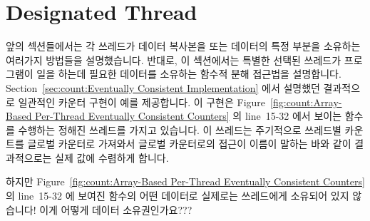 \section{Designated Thread}
\label{sec:owned:Designated Thread}

앞의 섹션들에서는 각 쓰레드가 데이터 복사본을 또는 데이터의 특정 부분을
소유하는 여러가지 방법들을 설명했습니다.
반대로, 이 섹션에서는 특별한 선택된 쓰레드가 프로그램이 일을 하는데 필요한
데이터를 소유하는 함수적 분해 접근법을 설명합니다.
Section~\ref{sec:count:Eventually Consistent Implementation} 에서 설명했던
결과적으로 일관적인 카운터 구현이 예를 제공합니다.
이 구현은
Figure~\ref{fig:count:Array-Based Per-Thread Eventually Consistent Counters} 의
line~15-32 에서 보이는  함수를 수행하는 정해진 쓰레드를 가지고
있습니다.
이  쓰레드는 주기적으로 쓰레드별 카운트를 글로벌 카운터로
가져와서 글로벌 카운터로의 접근이 이름이 말하는 바와 같이 결과적으로는 실제
값에 수렴하게 합니다.
\iffalse

The earlier sections describe ways of allowing each thread to keep its
own copy or its own portion of the data.
In contrast, this section describes a functional-decomposition approach,
where a special designated thread owns the rights to the data
that is required to do its job.
The eventually consistent counter implementation described in
Section~\ref{sec:count:Eventually Consistent Implementation} provides an example.
This implementation has a designated thread that runs the
\co{eventual()} function shown on lines~15-32 of
Figure~\ref{fig:count:Array-Based Per-Thread Eventually Consistent Counters}.
This \co{eventual()} thread periodically pulls the per-thread counts
into the global counter, so that accesses to the global counter will,
as the name says, eventually converge on the actual value.
\fi

\QuickQuiz{}
	하지만
	Figure~\ref{fig:count:Array-Based Per-Thread Eventually Consistent Counters}
	의 line~15-32 에 보여진  함수의 어떤 데이터로 실제로는
	 쓰레드에게 소유되어 있지 않습니다!
	이게 어떻게 데이터 소유권인가요???
	\iffalse


